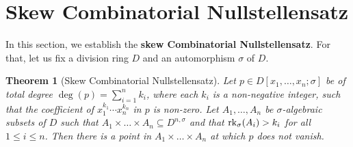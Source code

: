 \documentclass[11pt,reqno]{amsart}
\newtheorem{thm}{Theorem}[section]
\theoremstyle{definition}
\newcommand{\rk}{{\rm rk}}
\begin{document}
\section{Skew Combinatorial Nullstellensatz} \label{sec_central}

In this section, we establish the {\bf skew Combinatorial Nullstellensatz}. For that, let us fix a division ring $D$ and an automorphism $\sigma$ of $D$. 

\begin{thm}[Skew Combinatorial Nullstellensatz]\label{new2} Let $p \in D[x_1,\ldots,x_n;\sigma]$ be of total degree $\deg(p)=\sum_{i=1}^n {k_i}$, where each $k_i$ is a non-negative integer, such that the coefficient of $x_1^{k_1}\cdots x_n^{k_n}$ in $p$ is non-zero. Let $A_1,\ldots,A_n$ be $\sigma$-algebraic subsets of $D$ such that $A_1 \times \dots \times A_n \subseteq D^{n,\sigma}$ and that $\rk_\sigma(A_i) > k_i$ for all $1 \leq i \leq n$. Then there is a point in $A_1 \times \dots \times A_n$ at which $p$ does not vanish. 
\end{thm} 
\end{document}
